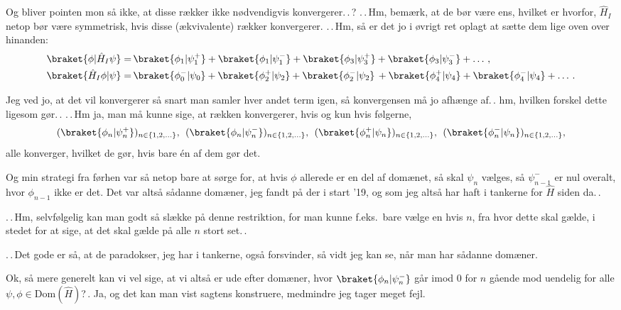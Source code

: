 \documentclass{report}
\begin{document}
Og bliver pointen mon så ikke, at disse rækker ikke nødvendigvis konvergerer.\,.\,? .\,.\,Hm, bemærk, at de bør være ens, hvilket er hvorfor, $\hat H_I$ netop bør være symmetrisk, hvis disse (ækvivalente) rækker konvergerer. .\,.\,Hm, så er det jo i øvrigt ret oplagt at sætte dem lige oven over hinanden:
\begin{align}
\begin{aligned}
	\braket{\phi| \hat H_I \psi} =&\, \braket{\phi_1| \psi_1^+} + \braket{\phi_1| \psi_1^-} + \braket{\phi_3| \psi_3^+} + \braket{\phi_3| \psi_3^-} + \ldots\,, \\
	\braket{\hat H_I \phi| \psi} =&\, \braket{\phi_0^-| \psi_0}  + \braket{\phi_2^+| \psi_2} + \braket{\phi_2^-| \psi_2} \,+ \braket{\phi_4^+| \psi_4} + \braket{\phi_4^-| \psi_4} + \ldots\,.
\label{pm-dotp}
\end{aligned}
\end{align}

Jeg ved jo, at det vil konvergerer så snart man samler hver andet term igen, så konvergensen må jo afhænge af.\,. hm, hvilken forskel dette ligesom gør.\,. .\,.\,Hm ja, man må kunne sige, at rækken konvergerer, hvis og kun hvis følgerne,
\begin{align}
\begin{aligned}
	(\braket{\phi_n| \psi_n^+})_{n\in{\{1,2,\ldots\}}}, \:\:
	(\braket{\phi_n| \psi_n^-})_{n\in{\{1,2,\ldots\}}}, \:\:
	(\braket{\phi_n^+| \psi_n})_{n\in{\{1,2,\ldots\}}}, \:\:
	(\braket{\phi_n^-| \psi_n})_{n\in{\{1,2,\ldots\}}}, 
\end{aligned}
\end{align}
alle konverger, hvilket de gør, hvis bare én af dem gør det. 

Og min strategi fra førhen var så netop bare at sørge for, at hvis $\phi$ allerede er en del af domænet, så skal $\psi_n$ vælges, så $\psi_{n-1}^-$ er nul overalt, hvor $\phi_{n-1}$ ikke er det. Det var altså sådanne domæner, jeg fandt på der i start '19, og som jeg altså har haft i tankerne for $\hat H$ siden da.\,. 

.\,.\,Hm, selvfølgelig kan man godt så slække på denne restriktion, for man kunne f.eks.\ bare vælge en hvis $n$, fra hvor dette skal gælde, i stedet for at sige, at det skal gælde på alle $n$ stort set.\,. 

.\,.\,Det gode er så, at de paradokser, jeg har i tankerne, også forsvinder, så vidt jeg kan se, når man har sådanne domæner.

Ok, så mere generelt kan vi vel sige, at vi altså er ude efter domæner, hvor $\braket{\phi_n|\psi_n^-}$ går imod 0 for $n$ gående mod uendelig for alle $\psi, \phi \in \mathrm{Dom}(\hat H)$?\,. Ja, og det kan man vist sagtens konstruere, medmindre jeg tager meget fejl. 
\end{document}
